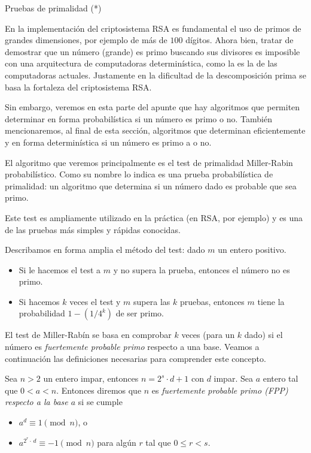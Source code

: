 \begin{section}{Pruebas de primalidad (*)}
    
En la implementación del  criptosistema RSA  es fundamental el uso de primos de grandes dimensiones, por ejemplo de más de $100$  dígitos. Ahora bien,  tratar de  demostrar que un número  (grande) es primo buscando sus divisores es imposible con una arquitectura de computadoras determinística,  como la es la de las computadoras actuales. Justamente en la dificultad de la descomposición prima se basa la fortaleza del criptosistema RSA. 

Sin embargo,  veremos en esta parte del apunte  que hay algoritmos que permiten determinar en forma probabilística si un número es primo o no. También mencionaremos, al final de esta sección, algoritmos que determinan eficientemente y en forma determinística si un número es primo a o no. 


El algoritmo que veremos principalmente es el test de primalidad Miller-Rabin probabilístico. Como su nombre lo indica  es una prueba probabilística de primalidad: un algoritmo que determina si un número dado es probable que sea primo.

Este test es ampliamente utilizado en la práctica (en RSA, por ejemplo) y es una de las pruebas más simples y rápidas conocidas.

Describamos en forma amplia el método del test: dado $m$ un entero positivo.
\begin{itemize}
    \item Si le hacemos el test a $m$ y no supera la prueba, entonces el número no es primo. 
    \item Si hacemos $k$ veces el test y $m$ supera las $k$ pruebas, entonces  $m$ tiene la probabilidad $1 - ( 1 / 4^k)$ de ser primo. 
\end{itemize}

El test de  Miller-Rabín se basa en comprobar $k$ veces (para un $k$ dado) si el número es \textit{fuertemente probable primo} respecto a una base. Veamos a continuación las definiciones necesarias para comprender este concepto. 

\begin{definicion}
    Sea $n > 2$ un entero impar, entonces $n = 2^s \cdot d + 1$ con $d$ impar. Sea $a$ entero  tal que $0 < a < n$. Entonces diremos que $n$ es \textit{fuertemente probable primo (FPP) respecto a la base $a$} si se cumple
    \begin{itemize}
        \item $a^{d} \equiv 1 \pmod{n}$, o
        \item $a^{2^r\cdot\, d} \equiv -1 \pmod{n}$  para algún $r$ tal que $0 \le r < s$.
    \end{itemize}
\end{definicion}


\end{section}
